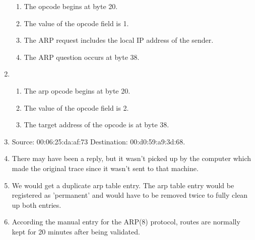 \documentclass[12pt]{article}
\begin{document}
\begin{enumerate}
\begin{enumerate}
            \item The opcode begins at byte 20.
            \item The value of the opcode field is 1.
            \item The ARP request includes the local IP address of the sender.
            \item The ARP question occurs at byte 38.
        \end{enumerate}
    \item
        \begin{enumerate}
            \item The arp opcode begins at byte 20.
            \item The value of the opcode field is 2.
            \item The target address of the opcode is at byte 38.
        \end{enumerate}
    \item Source: 00:06:25:da:af:73
        Destination: 00:d0:59:a9:3d:68.
    \item There may have been a reply, but it wasn't picked up by the computer
        which made the original trace since it wasn't sent to that machine.

    \item We would get a duplicate arp table entry. The arp table entry would
        be registered as 'permanent' and would have to be removed twice to
        fully clean up both entries.
    \item According the manual entry for the ARP(8) protocol, routes are
        normally kept for 20 minutes after being validated.

\end{enumerate}
\end{document}
